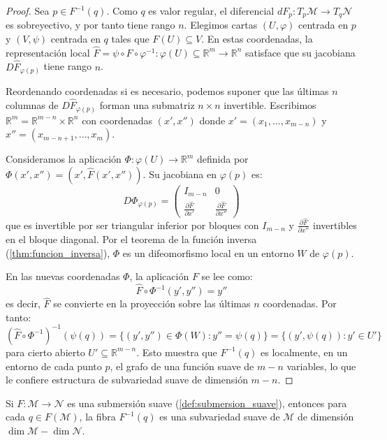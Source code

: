 \begin{proof}
Sea $p \in F^{-1}(q)$. Como $q$ es valor regular, el diferencial $dF_p: T_p\mathcal{M} \to T_q\mathcal{N}$ es sobreyectivo, y por tanto tiene rango $n$. Elegimos cartas $(U, \varphi)$ centrada en $p$ y $(V, \psi)$ centrada en $q$ tales que $F(U) \subseteq V$. En estas coordenadas, la representación local $\hat{F} = \psi \circ F \circ \varphi^{-1}: \varphi(U) \subseteq \mathbb{R}^m \to \mathbb{R}^n$ satisface que su jacobiana $D\hat{F}_{\varphi(p)}$ tiene rango $n$.

Reordenando coordenadas si es necesario, podemos suponer que las últimas $n$ columnas de $D\hat{F}_{\varphi(p)}$ forman una submatriz $n \times n$ invertible. Escribimos $\mathbb{R}^m = \mathbb{R}^{m-n} \times \mathbb{R}^n$ con coordenadas $(x', x'')$ donde $x' = (x_1, \ldots, x_{m-n})$ y $x'' = (x_{m-n+1}, \ldots, x_m)$.

Consideramos la aplicación $\Phi: \varphi(U) \to \mathbb{R}^m$ definida por $\Phi(x', x'') = (x', \hat{F}(x', x''))$. Su jacobiana en $\varphi(p)$ es:
\[
D\Phi_{\varphi(p)} = \begin{pmatrix} I_{m-n} & 0 \\ \frac{\partial \hat{F}}{\partial x'} & \frac{\partial \hat{F}}{\partial x''} \end{pmatrix}
\]
que es invertible por ser triangular inferior por bloques con $I_{m-n}$ y $\frac{\partial \hat{F}}{\partial x''}$ invertibles en el bloque diagonal. Por el teorema de la función inversa (\autoref{thm:funcion_inversa}), $\Phi$ es un difeomorfismo local en un entorno $W$ de $\varphi(p)$.

En las nuevas coordenadas $\Phi$, la aplicación $F$ se lee como:
\[
\hat{F} \circ \Phi^{-1}(y', y'') = y''
\]
es decir, $\hat{F}$ se convierte en la proyección sobre las últimas $n$ coordenadas. Por tanto:
\[
(\hat{F} \circ \Phi^{-1})^{-1}(\psi(q)) = \{(y', y'') \in \Phi(W) : y'' = \psi(q)\} = \{(y', \psi(q)) : y' \in U'\}
\]
para cierto abierto $U' \subseteq \mathbb{R}^{m-n}$. Esto muestra que $F^{-1}(q)$ es localmente, en un entorno de cada punto $p$, el grafo de una función suave de $m - n$ variables, lo que le confiere estructura de subvariedad suave de dimensión $m - n$.
\end{proof}

\begin{corollary}\label{cor:fibras_submersion}
Si $F: \mathcal{M} \to \mathcal{N}$ es una submersión suave (\autoref{def:submersion_suave}), entonces para cada $q \in F(\mathcal{M})$, la fibra $F^{-1}(q)$ es una subvariedad suave de $\mathcal{M}$ de dimensión $\dim \mathcal{M} - \dim \mathcal{N}$.
\end{corollary}

